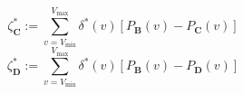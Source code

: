 \begin{equation}
 \zeta^*_\textbf{C} := \sum_{v = V_\text{min}}^{V_\text{max}} \delta^{*}(v) \left[P_\textbf{B}(v) - P_\textbf{C}(v)\right]
 \label{ch4:equ:voltage-metric-c}
\end{equation}
\begin{equation}
 \zeta^*_\textbf{D} := \sum_{v = V_\text{min}}^{V_\text{max}} \delta^{*}(v) \left[P_\textbf{B}(v) - P_\textbf{D}(v)\right]
 \label{ch4:equ:voltage-metric-d}
\end{equation}